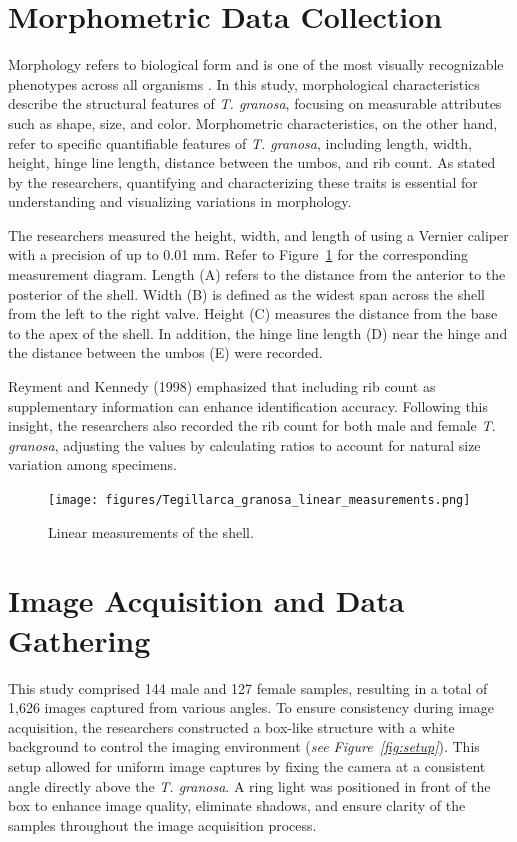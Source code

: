 \newpage
\section{Morphometric Data Collection}
\label{sec:morphochar}

Morphology refers to biological form and is one of the most visually recognizable phenotypes across all organisms \cite{tsutsumi2023}. In this study, morphological characteristics describe the structural features of \textit{T. granosa}, focusing on measurable attributes such as shape, size, and color. Morphometric characteristics, on the other hand, refer to specific quantifiable features of \textit{T. granosa}, including length, width, height, hinge line length, distance between the umbos, and rib count. As stated by the researchers, quantifying and characterizing these traits is essential for understanding and visualizing variations in \Tgranosa morphology.

The researchers measured the height, width, and length of \Tgranosa using a Vernier caliper with a precision of up to 0.01 mm. Refer to Figure~\ref{fig:linear_measurements} for the corresponding measurement diagram. Length (A) refers to the distance from the anterior to the posterior of the shell. Width (B) is defined as the widest span across the shell from the left to the right valve. Height (C) measures the distance from the base to the apex of the shell. In addition, the hinge line length (D) near the hinge and the distance between the umbos (E) were recorded.

Reyment and Kennedy (1998) emphasized that including rib count as supplementary information can enhance identification accuracy. Following this insight, the researchers also recorded the rib count for both male and female \textit{T. granosa}, adjusting the values by calculating ratios to account for natural size variation among specimens.

\begin{figure}[!htbp]
	\centering
	\texttt{[image: figures/Tegillarca\_granosa\_linear\_measurements.png]}
	\caption{Linear measurements of the \Tgranosa shell.}
	\label{fig:linear_measurements}
\end{figure}

\section{Image Acquisition and Data Gathering}
\label{sec:imageprocess}

This study comprised 144 male and 127 female \Tgranosa samples, resulting in a total of 1,626 images captured from various angles. To ensure consistency during image acquisition, the researchers constructed a box-like structure with a white background to control the imaging environment (\textit{see Figure~\ref{fig:setup}}). This setup allowed for uniform image captures by fixing the camera at a consistent angle directly above the \textit{T. granosa}. A ring light was positioned in front of the box to enhance image quality, eliminate shadows, and ensure clarity of the samples throughout the image acquisition process.

